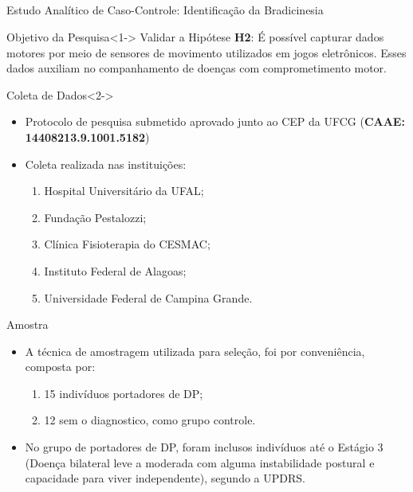 \documentclass{beamer}
\begin{document}
\subsection{}
\begin{frame}{Estudo Analítico de Caso-Controle: Identificação da Bradicinesia} 
    \begin{block}{Objetivo da Pesquisa}<1->
      Validar a Hipótese \textbf{H2}: É possível capturar dados motores por meio de sensores de movimento utilizados em jogos eletrônicos. Esses dados auxiliam no companhamento de doenças  com comprometimento motor.

    \end{block}
		\begin{block}{Coleta de Dados}<2->
			\begin{itemize}
				\item Protocolo de pesquisa submetido aprovado junto ao CEP da UFCG (\textbf{CAAE: 14408213.9.1001.5182})
				\item Coleta realizada nas instituições:
					\begin{enumerate}
						\item Hospital Universitário da UFAL;
						\item Fundação Pestalozzi;
						\item Clínica Fisioterapia do CESMAC;
						\item Instituto Federal de Alagoas;
						\item Universidade Federal de Campina Grande.
					\end{enumerate}				
			\end{itemize}
    \end{block}
\end{frame}

\begin{frame}{Amostra} 
    \begin{block}{}
			\begin{itemize}
				\item A técnica de amostragem utilizada para seleção, foi por conveniência, composta por:
				\begin{enumerate}
					\item 15 indivíduos portadores de DP;
					\item 12 sem o diagnostico, como grupo controle.
				\end{enumerate}
					\item No grupo de portadores de DP, foram inclusos indivíduos até o Estágio 3 (Doença bilateral leve a moderada com alguma instabilidade postural e capacidade para viver independente), segundo a UPDRS.
				\end{itemize}
    \end{block}
\end{frame}
\end{document}
